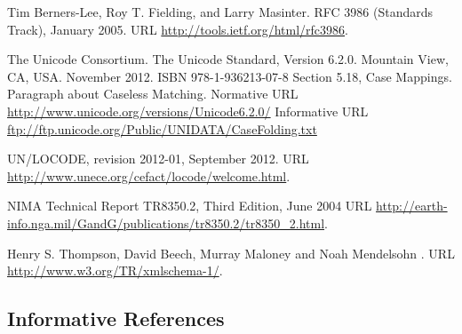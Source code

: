 \begin{thebibliography}{10}
Tim Berners-Lee, Roy T. Fielding, and Larry Masinter.
\newblock RFC 3986 (Standards Track), January 2005.
\newblock URL \url{http://tools.ietf.org/html/rfc3986}.

The Unicode Consortium.
\newblock The Unicode Standard, Version 6.2.0. 
\newblock Mountain View, CA, USA. November 2012. ISBN 978-1-936213-07-8
\newblock Section 5.18, Case Mappings. Paragraph about Caseless Matching.
\newblock Normative URL \url{http://www.unicode.org/versions/Unicode6.2.0/}
\newblock Informative URL \url{ftp://ftp.unicode.org/Public/UNIDATA/CaseFolding.txt}

\newblock UN/LOCODE, revision 2012-01, September 2012.
\newblock URL \url{http://www.unece.org/cefact/locode/welcome.html}.

\newblock NIMA Technical Report TR8350.2, Third Edition, June 2004
\newblock URL \url{http://earth-info.nga.mil/GandG/publications/tr8350.2/tr8350_2.html}.

Henry S. Thompson, David Beech, Murray Maloney and Noah Mendelsohn
.
\newblock URL \url{http://www.w3.org/TR/xmlschema-1/}.

\end{thebibliography}

\subsection*{Informative References}

